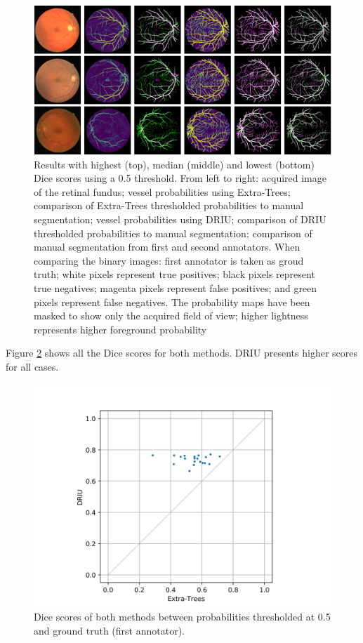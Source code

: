 \begin{figure}[H]
  \includegraphics[width=\textwidth]{figures/collage}
  \caption{Results with highest (top), median (middle) and lowest (bottom) Dice scores using a 0.5 threshold. From left to right: acquired image of the retinal fundus; vessel probabilities using Extra-Trees; comparison of Extra-Trees thresholded probabilities to manual segmentation; vessel probabilities using DRIU; comparison of DRIU thresholded probabilities to manual segmentation; comparison of manual segmentation from first and second annotators. When comparing the binary images: first annotator is taken as groud truth; white pixels represent true positives; black pixels represent true negatives; magenta pixels represent false positives; and green pixels represent false negatives. The probability maps have been masked to show only the acquired field of view; higher lightness represents higher foreground probability} \label{fig:collage}
\end{figure}

Figure \ref{fig:dice} shows all the Dice scores for both methods. DRIU presents higher scores for all cases.

\begin{figure}[H]
  \includegraphics[width=\textwidth]{figures/dices}
  \caption{Dice scores of both methods between probabilities thresholded at 0.5 and ground truth (first annotator).} \label{fig:dice}
\end{figure}

